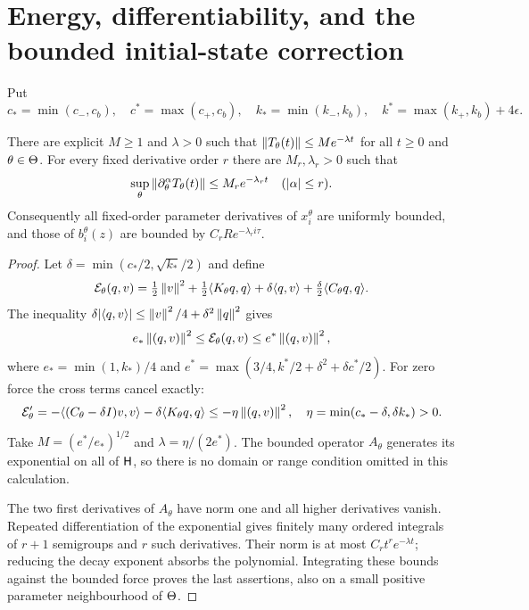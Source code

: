\section{Energy, differentiability, and the bounded initial-state correction}
\label{sec:r35-energy}
Put
\[
 c_* =\min(c_-,c_b),\quad c^*=\max(c_+,c_b),\quad
 k_* =\min(k_-,k_b),\quad k^*=\max(k_+,k_b)+4\epsilon.
\]
\begin{lemma}\label{lem:r35-energy}
There are explicit $M\ge1$ and $\lambda>0$ such that
$\left\|T_\theta(t)\right\|\le Me^{-\lambda t}$ for all $t\ge0$ and $\theta\in\Theta$.
For every fixed derivative order $r$ there are $M_r,\lambda_r>0$ such that
\[
 \sup_\theta\left\|\partial_\theta^\alpha T_\theta(t)\right\|
 \le M_r e^{-\lambda_r t}\quad(|\alpha|\le r).
\]
Consequently all fixed-order parameter derivatives of $x_i^\theta$ are uniformly bounded, and those of $b_i^\theta(z)$ are bounded by $C_rR e^{-\lambda_r i\tau}$.
\end{lemma}
\begin{proof}
Let $\delta=\min(c_*/2,\sqrt{k_*}/2)$ and define
\[
 \mathcal E_\theta(q,v)=\tfrac12\left\|v\right\|^2+\tfrac12\langle K_\theta q,q\rangle
       +\delta\langle q,v\rangle+\tfrac\delta2\langle C_\theta q,q\rangle.
\]
The inequality $\delta|\langle q,v\rangle|\le\left\|v\right\|^2/4+\delta^2\left\|q\right\|^2$ gives
\[
 e_*\left\|(q,v)\right\|^2\le\mathcal E_\theta(q,v)\le e^*\left\|(q,v)\right\|^2,
\]
where $e_* =\min(1,k_*)/4$ and
$e^*=\max(3/4,k^*/2+\delta^2+\delta c^*/2)$.
For zero force the cross terms cancel exactly:
\[
 \mathcal E_\theta'=-\langle (C_\theta-\delta I)v,v\rangle
                    -\delta\langle K_\theta q,q\rangle
 \le-\eta\left\|(q,v)\right\|^2,
 \quad \eta=\min(c_*-\delta,\delta k_*)>0.
\]
Take $M=(e^*/e_*)^{1/2}$ and $\lambda=\eta/(2e^*)$.
The bounded operator $A_\theta$ generates its exponential on all of $\mathsf H$, so there is no domain or range condition omitted in this calculation.

The two first derivatives of $A_\theta$ have norm one and all higher derivatives vanish. Repeated differentiation of the exponential gives finitely many ordered integrals of $r+1$ semigroups and $r$ such derivatives. Their norm is at most $C_r t^r e^{-\lambda t}$; reducing the decay exponent absorbs the polynomial. Integrating these bounds against the bounded force proves the last assertions, also on a small positive parameter neighbourhood of $\Theta$.
\end{proof}

